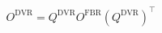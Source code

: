 \begin{equation}
O^{ \mathrm{DVR} } = Q^{ \mathrm{DVR} } O^{\mathrm{FBR}} (Q^{ \mathrm{DVR} })^\intercal
\label{eq:dvr_operator_transf}
\end{equation}